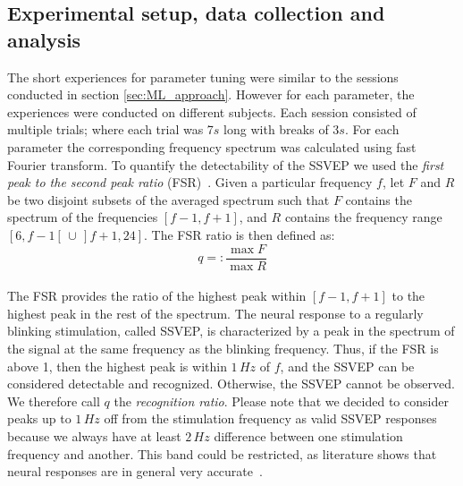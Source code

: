 \documentclass[smallextended]{svjour3}
\begin{document}
\subsection{Experimental setup, data collection and analysis}
The short experiences for parameter tuning were similar to the sessions conducted in section \ref{sec:ML_approach}. However for each parameter, the experiences were conducted on different subjects. Each session consisted of multiple trials; where each trial was 7$s$ long with breaks of 3$s$. For each parameter the corresponding frequency spectrum was calculated using fast Fourier transform. 
To quantify the detectability of the SSVEP we used the \textit{first peak to the second peak ratio} (FSR)~\cite{Zheng2010}. 
Given a particular frequency $f$, let $F$ and $R$ be two disjoint subsets of the averaged spectrum such that $F$ contains the spectrum of the frequencies $[f-1, f+1]$, and $R$ contains the frequency range $[6, f-1[ \,\cup\, ]f+1, 24]$. The FSR ratio is then defined as:
\begin{equation}
\label{recog_rat}
q =:\frac{\max F}{\max R}
\end{equation}
\\
The FSR provides the ratio of the highest peak within $[f-1, f+1]$ to the highest peak in the rest of the spectrum. The neural response to a regularly blinking stimulation, called SSVEP, is characterized by a peak in the spectrum of the signal at the same frequency as the blinking frequency. Thus, if the FSR is above 1, then the highest peak is within $1\,\mathit{Hz}$ of $f$, and the SSVEP can be considered detectable and recognized. 
Otherwise, the SSVEP cannot be observed. 
We therefore call $q$ the \textit{recognition ratio}.
Please note that we decided to consider peaks up to $1\,\mathit{Hz}$ off from the stimulation frequency as valid SSVEP responses because we always have at least $2\,\mathit{Hz}$ difference between one stimulation frequency and another. This band could be restricted, as literature shows that neural responses are in general very accurate~\cite{SSVEPfiability}.
\end{document}
